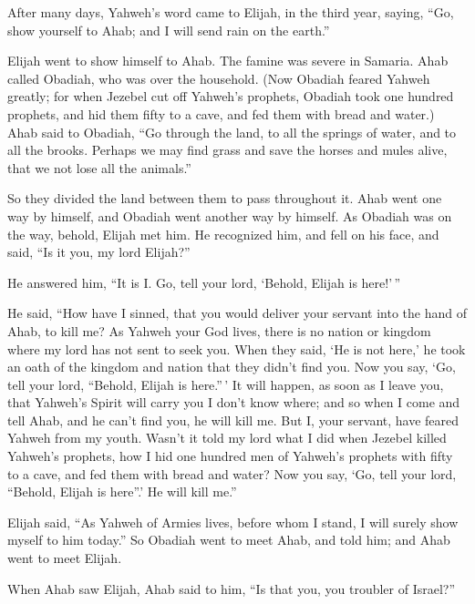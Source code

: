  After many days, Yahweh's word came to Elijah, in the third
year, saying, ``Go, show yourself to Ahab; and I will send rain on the
earth.''

 Elijah went to show himself to Ahab. The famine was severe
in Samaria.  Ahab called Obadiah, who was over the
household. (Now Obadiah feared Yahweh greatly;  for when
Jezebel cut off Yahweh's prophets, Obadiah took one hundred prophets,
and hid them fifty to a cave, and fed them with bread and water.)
 Ahab said to Obadiah, ``Go through the land, to all the
springs of water, and to all the brooks. Perhaps we may find grass and
save the horses and mules alive, that we not lose all the animals.''

 So they divided the land between them to pass throughout
it. Ahab went one way by himself, and Obadiah went another way by
himself.  As Obadiah was on the way, behold, Elijah met him.
He recognized him, and fell on his face, and said, ``Is it you, my lord
Elijah?''

 He answered him, ``It is I. Go, tell your lord, `Behold,
Elijah is here!'\,''

 He said, ``How have I sinned, that you would deliver your
servant into the hand of Ahab, to kill me?  As Yahweh your
God lives, there is no nation or kingdom where my lord has not sent to
seek you. When they said, `He is not here,' he took an oath of the
kingdom and nation that they didn't find you.  Now you say,
`Go, tell your lord, ``Behold, Elijah is here.''\,'  It
will happen, as soon as I leave you, that Yahweh's Spirit will carry you
I don't know where; and so when I come and tell Ahab, and he can't find
you, he will kill me. But I, your servant, have feared Yahweh from my
youth.  Wasn't it told my lord what I did when Jezebel
killed Yahweh's prophets, how I hid one hundred men of Yahweh's prophets
with fifty to a cave, and fed them with bread and water? 
Now you say, `Go, tell your lord, ``Behold, Elijah is here''.' He will
kill me.''

 Elijah said, ``As Yahweh of Armies lives, before whom I
stand, I will surely show myself to him today.''  So
Obadiah went to meet Ahab, and told him; and Ahab went to meet Elijah.

 When Ahab saw Elijah, Ahab said to him, ``Is that you, you
troubler of Israel?''

